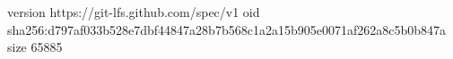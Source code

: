 version https://git-lfs.github.com/spec/v1
oid sha256:d797af033b528e7dbf44847a28b7b568c1a2a15b905e0071af262a8c5b0b847a
size 65885
